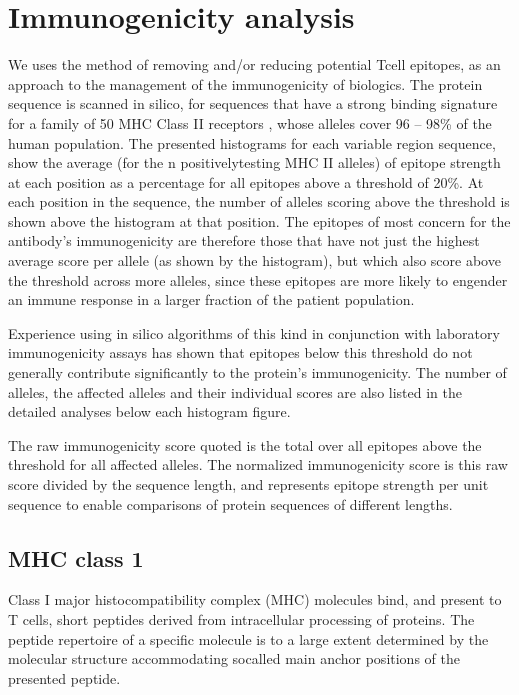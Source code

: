 \documentclass[letterpaper,10pt,english]{jupyterBook}
\begin{document}
\chapter{Immunogenicity analysis}
\label{\detokenize{ipynb/chapter2:immunogenicity-analysis}}\label{\detokenize{ipynb/chapter2::doc}}
\sphinxAtStartPar
We uses the method of removing and/or reducing potential T\sphinxhyphen{}cell epitopes, as an approach to the management of the immunogenicity of biologics. The protein sequence is scanned in silico, for sequences that have a strong binding signature for a family of 50 MHC Class II receptors , whose alleles cover 96 – 98\% of the human population. The presented histograms for each variable region sequence, show the average (for the n positively\sphinxhyphen{}testing MHC II alleles) of epitope strength at each position as a percentage for all epitopes above a threshold of 20\%. At each position in the sequence, the number of alleles scoring above the threshold is shown above the histogram at that position. The epitopes of most concern for the antibody’s immunogenicity are therefore those that have not just the highest average score per allele (as shown by the histogram), but which also score above the threshold across more alleles, since these epitopes are more likely to engender an immune response in a larger fraction of the patient population.

\sphinxAtStartPar
Experience using in silico algorithms of this kind in conjunction with laboratory immunogenicity assays has shown that epitopes below this threshold do not generally contribute significantly to the protein’s immunogenicity. The number of alleles, the affected alleles and their individual scores are also listed in the detailed analyses below each histogram figure.

\sphinxAtStartPar
The raw immunogenicity score quoted is the total over all epitopes above the threshold for all affected alleles. The normalized immunogenicity score is this raw score divided by the sequence length, and represents epitope strength per unit sequence to enable comparisons of protein sequences of different lengths.


\section{MHC class 1}
\label{\detokenize{ipynb/chapter2:mhc-class-1}}
\sphinxAtStartPar
Class I major histocompatibility complex (MHC) molecules bind, and present to T cells, short peptides derived from intracellular processing of proteins. The peptide repertoire of a specific molecule is to a large extent determined by the molecular structure accommodating so\sphinxhyphen{}called main anchor positions of the presented peptide.
\end{document}
